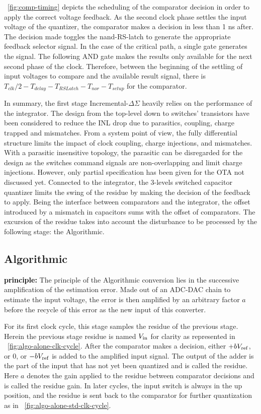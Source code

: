 \figurename~\ref{fig:comp-timing} depicts the scheduling of the comparator decision in order to apply the correct voltage feedback. As the second clock phase settles the input voltage of the quantizer, the comparator makes a decision in less than 1 ns after. The decision made toggles the nand-RS-latch to generate the appropriate feedback selector signal. In the case of the critical path, a single gate generates the signal. The following AND gate makes the results only available for the next second phase of the clock. Therefore, between the beginning of the settling of input voltages to compare and the available result signal, there is \(T_{clk}/2-T_{delay}-T_{RSLatch}-T_{nor}-T_{setup}\) for the comparator.

In summary, the first stage Incremental-$\Delta\Sigma$ heavily relies on the performance of the integrator. The design from the top-level down to switches' transistors have been considered to reduce the INL drop due to parasitics, coupling, charge trapped and mismatches. From a system point of view, the fully differential structure limits the impact of clock coupling, charge injections, and mismatches. With a parasitic insensitive topology, the parasitic can be disregarded for the design as the switches command signals are non-overlapping and limit charge injections. However, only partial specification has been given for the OTA not discussed yet.
Connected to the integrator, the 3-levels switched capacitor quantizer limits the swing of the residue by making the decision of the feedback to apply. Being the interface between comparators and the integrator, the offset introduced by a mismatch in capacitors sums with the offset of comparators. The excursion of the residue takes into account the disturbance to be processed by the following stage: the Algorithmic.
\clearpage
	 
\subsection{Algorithmic}                    %
\textbf{\textcolor{black}{principle:}}
The principle of the Algorithmic conversion lies in the successive amplification of the estimation error. Made out of an ADC-DAC chain to estimate the input voltage, the error is then amplified by an arbitrary factor $a$ before the recycle of this error as the new input of this converter.

For its first clock cycle, this stage samples the residue of the previous stage. Herein the previous stage residue is named \(V_{\rm in}\) for clarity as represented in \figurename~\ref{fig:algo-alone-clk-cycle}. After the comparator makes a decision, either \(+bV_{\rm ref} \), or 0, or \(-bV_{\rm ref} \) is added to the amplified input signal. The output of the adder is the part of the input that has not yet been quantized and is called the residue. Here \(a\) denotes the gain applied to the residue between comparator decisions and is called the residue gain. In later cycles, the input switch is always in the up position, and the residue is sent back to the comparator for further quantization as in \figurename~\ref{fig:algo-alone-std-clk-cycle}.

